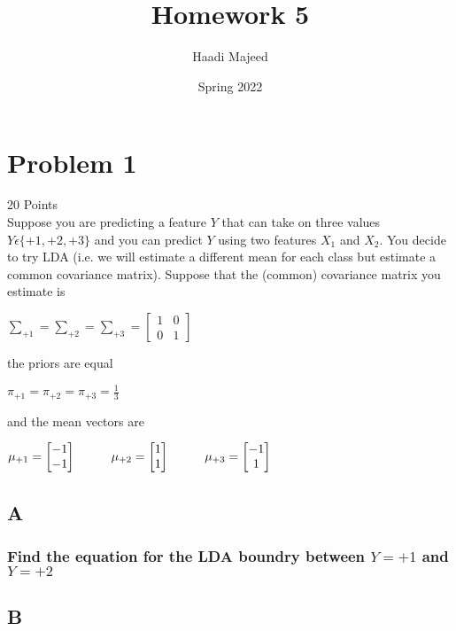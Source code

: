 \documentclass[12pt]{article}
\title{ \course \\\large Homework 5 }
\author{ Haadi Majeed }
\date{Spring 2022}
\newcommand\tab[1][1cm]{\hspace*{#1}}
\begin{document}
\maketitle
\pagebreak

\pagebreak
\section{Problem 1}
20 Points\\
Suppose you are predicting a feature $Y$ that can take on three values $Y \epsilon \{+1, +2, +3\}$ and you can predict $Y$ using two features $X_1$ and $X_2$. You decide to try LDA (i.e. we will estimate a different mean for each class but estimate a common covariance matrix). Suppose that the (common) covariance matrix you estimate is
\begin{center}
    $\sum_{+1} = \sum_{+2} = \sum_{+3} = \begin{bmatrix} 1 &0\\0 & 1\end{bmatrix}$
\end{center}
the priors are equal
\begin{center}
    $\pi_{+1} = \pi_{+2} = \pi_{+3} = \frac{1}{3}$
\end{center}
and the mean vectors are
\begin{center}
    $\mu_{+1} = \begin{bmatrix} -1\\-1\end{bmatrix}\tab\mu_{+2} = \begin{bmatrix} 1\\1\end{bmatrix}\tab\mu_{+3} = \begin{bmatrix} -1\\1\end{bmatrix}$
\end{center}

\subsection{A}
\subsubsection{Find the equation for the LDA boundry between $Y = +1$ and $Y = +2$}

\subsection{B}
\end{document}
